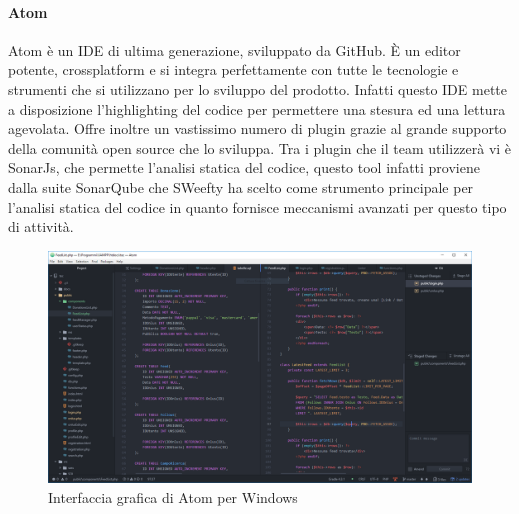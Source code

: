 	
	\paragraph{Atom}
	\label{sec:Atom}
	\Spazio	
	Atom è un IDE di ultima generazione, sviluppato da GitHub. È un editor potente,
	crossplatform e si integra perfettamente con tutte le tecnologie e strumenti che si utilizzano per lo sviluppo del prodotto. Infatti questo IDE mette a disposizione l'highlighting del codice per permettere una stesura ed una lettura agevolata. 
	Offre inoltre un vastissimo numero di plugin grazie al grande supporto della comunità open source che lo sviluppa. Tra i plugin che il team utilizzerà vi è SonarJs, che permette l'analisi statica del codice, questo tool infatti proviene dalla suite SonarQube che SWeefty ha scelto come strumento principale per l'analisi statica del codice in quanto fornisce meccanismi avanzati per questo tipo di attività.
	
	\begin{figure}[H]
		\label{Atom}
		\centering 
		\includegraphics[width=1\textwidth]{images/atom.png}
		\caption{Interfaccia grafica di Atom per Windows} %
	\end{figure}
	
			
